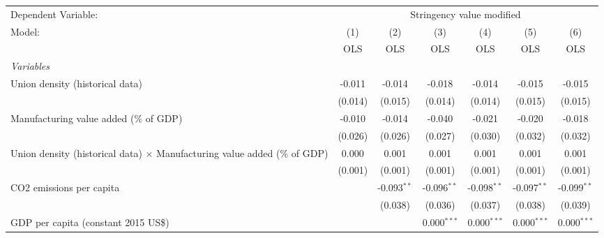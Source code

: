
\begingroup
\centering
\begin{tabular}{lcccccc}
   \toprule
   Dependent Variable: & \multicolumn{6}{c}{Stringency value modified}\\
   Model:                                                                           & (1)     & (2)           & (3)           & (4)           & (5)           & (6)\\  
                                                                                    &  OLS    & OLS           & OLS           & OLS           & OLS           & OLS\\  
   \midrule
   \emph{Variables}\\
   Union density (historical data)                                                  & -0.011  & -0.014        & -0.018        & -0.014        & -0.015        & -0.015\\   
                                                                                    & (0.014) & (0.015)       & (0.014)       & (0.014)       & (0.015)       & (0.015)\\   
   Manufacturing value added (\% of GDP)                                            & -0.010  & -0.014        & -0.040        & -0.021        & -0.020        & -0.018\\   
                                                                                    & (0.026) & (0.026)       & (0.027)       & (0.030)       & (0.032)       & (0.032)\\   
   Union density (historical data) $\times$ Manufacturing value added (\% of GDP)   & 0.000   & 0.001         & 0.001         & 0.001         & 0.001         & 0.001\\   
                                                                                    & (0.001) & (0.001)       & (0.001)       & (0.001)       & (0.001)       & (0.001)\\   
   CO2 emissions per capita                                                         &         & -0.093$^{**}$ & -0.096$^{**}$ & -0.098$^{**}$ & -0.097$^{**}$ & -0.099$^{**}$\\   
                                                                                    &         & (0.038)       & (0.036)       & (0.037)       & (0.038)       & (0.039)\\   
   GDP per capita (constant 2015 US\$)                                              &         &               & 0.000$^{***}$ & 0.000$^{***}$ & 0.000$^{***}$ & 0.000$^{***}$\\   

\end{tabular}
